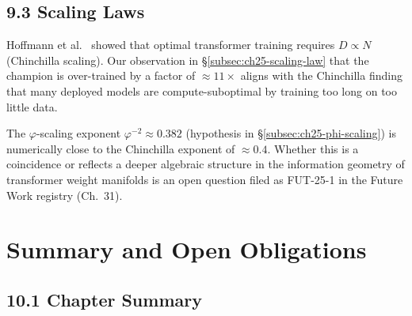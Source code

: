 \subsection{9.3 Scaling Laws}
\label{subsec:ch25-scaling-related}

Hoffmann et al.\ \citep{hoffmann_chinchilla_2022} showed that optimal
transformer training requires $D \propto N$ (Chinchilla scaling).
Our observation in §\ref{subsec:ch25-scaling-law} that the champion
is over-trained by a factor of $\approx 11\times$ aligns with the
Chinchilla finding that many deployed models are compute-suboptimal
by training too long on too little data.

The $\varphi$-scaling exponent $\varphi^{-2} \approx 0.382$ (hypothesis
in §\ref{subsec:ch25-phi-scaling}) is numerically close to the
Chinchilla exponent of $\approx 0.4$.  Whether this is a coincidence
or reflects a deeper algebraic structure in the information geometry
of transformer weight manifolds is an open question filed as
FUT-25-1 in the Future Work registry (Ch.~31).

\section{Summary and Open Obligations}
\label{sec:ch25-summary}

\subsection{10.1 Chapter Summary}
\label{subsec:ch25-chapter-summary}

